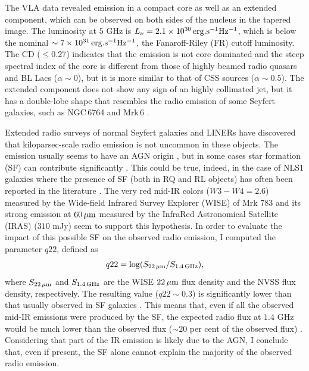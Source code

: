 \documentclass[../main.tex]{subfiles}
\begin{document}
The VLA data revealed emission in a compact core as well as an extended component, which can be observed on both sides of the nucleus in the tapered image.
The luminosity at $5$ GHz is $L_{\nu}=2.1\times10^{30}\,{\rm erg.s^{-1} Hz^{-1}}$, which is below the nominal $\sim 7\times10^{31}\,{\rm erg.s^{-1} Hz^{-1}}$, the Fanaroff-Riley (FR) cutoff luminosity. 
The CD ($\leq 0.27$) indicates that the emission is not core dominated and the steep spectral index of the core is different from those of highly beamed radio quasars and BL Lacs ($\alpha \sim 0$), but it is more similar to that of CSS sources ($\alpha \sim 0.5$).
The extended component does not show any sign of an highly collimated jet, but it has a double-lobe shape that resembles the radio emission of some Seyfert galaxies, such as NGC\,6764 \citep{Hota06} and Mrk\,6 \citep{Kharb06}.

Extended radio surveys of normal Seyfert galaxies and LINERs \citep[e.g.,][]{Baum93,Gallimore06,Singh15} have discovered that kiloparsec-scale radio emission is not uncommon in these objects. 
The emission usually seems to have an AGN origin \citep{Gallimore06,Singh15}, but in some cases star formation (SF) can  contribute significantly \citep[e.g.,][]{Baum93}.
This could be true, indeed, in the case of NLS1 galaxies where the presence of SF (both in RQ and RL objects) has often been reported in the literature \citep[e.g.,][]{Sani10,Caccianiga15}.
The very red mid-IR colors ($W3-W4=2.6$) measured by the Wide-field Infrared Survey Explorer (WISE) of Mrk 783 and its strong emission at $60\,{\rm\mu m}$ measured by the InfraRed Astronomical Satellite (IRAS) ($310$ mJy) seem to support this hypothesis. 
In order to evaluate the impact of this possible SF on the observed radio emission, I computed the parameter $q22$, defined as\begin{equation}
\label{eq:q22}
q22 = \log (S_{22\,{\rm \mu m}}/S_{1.4\,{\rm GHz}}),
\end{equation}
where $S_{22\,{\rm \mu m}}$ and $S_{1.4\,{\rm GHz}}$ are the WISE $22\,{\rm \mu m}$ flux density and the NVSS flux density, respectively.
The resulting value ($q22\sim0.3$) is significantly lower than that usually observed in SF galaxies \citep[$q22>1$;][]{Caccianiga15}. 
This means that, even if all the observed mid-IR emissions were produced by the SF, the expected radio flux at $1.4$ GHz would be much lower than the observed flux ($\sim20$ per cent of the observed flux) . 
Considering that part of the IR emission is likely due to the AGN, I conclude that, even if present, the SF alone cannot explain the majority of the observed radio emission.
\end{document}
